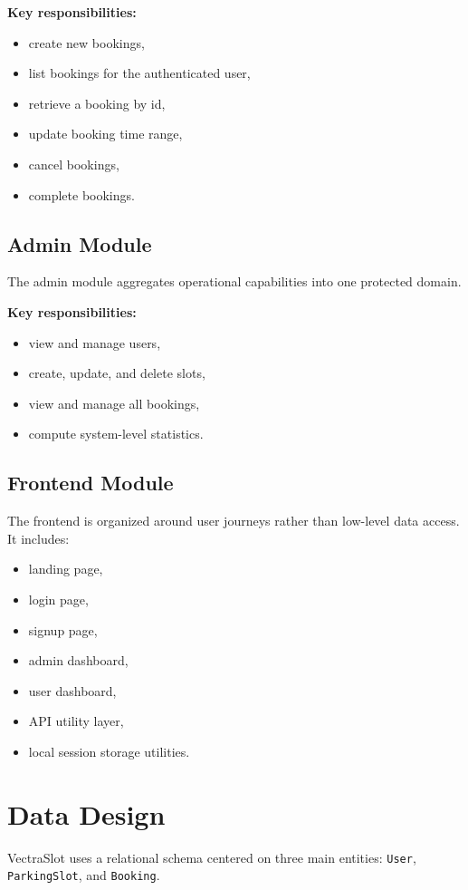 \documentclass[12pt,a4paper]{article}
\begin{document}
\textbf{Key responsibilities:}
\begin{itemize}
    \item create new bookings,
    \item list bookings for the authenticated user,
    \item retrieve a booking by id,
    \item update booking time range,
    \item cancel bookings,
    \item complete bookings.
\end{itemize}

\subsection{Admin Module}
The admin module aggregates operational capabilities into one protected domain.

\textbf{Key responsibilities:}
\begin{itemize}
    \item view and manage users,
    \item create, update, and delete slots,
    \item view and manage all bookings,
    \item compute system-level statistics.
\end{itemize}

\subsection{Frontend Module}
The frontend is organized around user journeys rather than low-level data access. It includes:
\begin{itemize}
    \item landing page,
    \item login page,
    \item signup page,
    \item admin dashboard,
    \item user dashboard,
    \item API utility layer,
    \item local session storage utilities.
\end{itemize}

\section{Data Design}
VectraSlot uses a relational schema centered on three main entities: \texttt{User}, \texttt{ParkingSlot}, and \texttt{Booking}.
\end{document}
